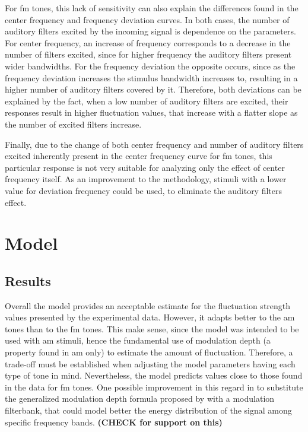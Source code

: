 \documentclass[../main.tex]{subfiles}
\begin{document}
For \gls{fm} tones, this lack of sensitivity can also explain the differences
found in the center frequency and frequency deviation curves. In both cases,
the number of auditory filters excited by the incoming signal is dependence on
the parameters. For center frequency, an increase of frequency corresponds to a
decrease in the number of filters excited, since for higher frequency the
auditory filters present wider bandwidths. For the frequency deviation the
opposite occurs, since as the frequency deviation increases the stimulus
bandwidth increases to, resulting in a higher number of auditory filters covered
by it. Therefore, both deviations can be explained by the fact, when a low
number of auditory filters are excited, their responses result in higher
fluctuation values, that increase with a flatter slope as the number of excited
filters increase.

Finally, due to the change of both center frequency and number of auditory
filters excited inherently present in the center frequency curve for \gls{fm}
tones, this particular response is not very suitable for analyzing only the
effect of center frequency itself. As an improvement to the methodology,
stimuli with a lower value for deviation frequency could be used, to eliminate
the auditory filters effect.

\section{Model}

\subsection{Results}

Overall the model provides an acceptable estimate for the fluctuation strength
values presented by the experimental data. However, it adapts better to the
\gls{am} tones than to the \gls{fm} tones. This make sense, since the model
was intended to be used with \gls{am} stimuli, hence the fundamental use of
modulation depth (a property found in \gls{am} only) to estimate the amount of
fluctuation. Therefore, a trade-off must be established when adjusting the model
parameters having each type of tone in mind. Nevertheless, the model predicts
values close to those found in the data for \gls{fm} tones. One possible
improvement in this regard in to substitute the generalized modulation depth
formula proposed by \citeauthor{daniel1997psychoacoustical} with a modulation
filterbank, that could model better the energy distribution of the signal
among specific frequency bands. {\bf \color{red} (CHECK \cite{Dau1997} for
support on this)}
\end{document}
